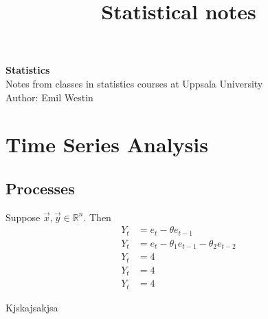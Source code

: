 \documentclass[11pt]{article}
\begin{document}
\title{Statistical notes}

\thispagestyle{empty}

\begin{center}
{\LARGE \bf Statistics}\\
Notes from classes in statistics courses at Uppsala University \\
Author: Emil Westin
\end{center}

\section{Time Series Analysis}
\subsection{Processes}

Suppose $\vec{x},\vec{y} \in \mathbb{R}^n$. Then 
\begin{align}
Y_t & = e_t - \theta e_{t-1} \label{MA1} \\
Y_t & = e_t - \theta_1 e_{t-1} -  \theta_2 e_{t-2} \label{MA2} \\
Y_t & = 4 \label{AR1} \\
Y_t & = 4 \label{AR2} \\
Y_t & = 4 \label{ARMA} 
\end{align}

Kjskajsakjsa
\end{document}
